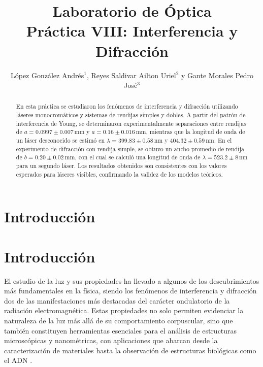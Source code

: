 \documentclass[article,12pt]{elsarticle}
\begin{document}

\begin{frontmatter}
    \title{Laboratorio de Óptica \\ Práctica VIII: Interferencia y Difracción}
    \author{López González Andrés$^1$, Reyes Saldivar Ailton Uriel$^2$ y Gante Morales Pedro José$^3$}
    \address{$^1$ Facultad de Ciencias, Universidad Nacional Autónoma de México, México CDMX.}

\begin{abstract}
En esta práctica se estudiaron los fenómenos de interferencia y difracción utilizando láseres monocromáticos y sistemas de rendijas simples y dobles. A partir del patrón de interferencia de Young, se determinaron experimentalmente separaciones entre rendijas de $a = 0.0997 \pm 0.007\, \text{mm}$ y $a = 0.16 \pm 0.016\, \text{mm}$, mientras que la longitud de onda de un láser desconocido se estimó en $ \lambda = 399.83 \pm 0.58\, \text{nm}$ y $404.32 \pm 0.59\, \text{nm}$. En el experimento de difracción con rendija simple, se obtuvo un ancho promedio de rendija de $b = 0.20 \pm 0.02\, \text{mm}$, con el cual se calculó una longitud de onda de $\lambda = 523.2 \pm 8\, \text{nm}$ para un segundo láser. Los resultados obtenidos son consistentes con los valores esperados para láseres visibles, confirmando la validez de los modelos teóricos.

\end{abstract}
    
\end{frontmatter}

\section{Introducción}

\section*{Introducción}

El estudio de la luz y sus propiedades ha llevado a algunos de los descubrimientos más fundamentales en la física, siendo los fenómenos de interferencia y difracción dos de las manifestaciones más destacadas del carácter ondulatorio de la radiación electromagnética. Estas propiedades no solo permiten evidenciar la naturaleza de la luz más allá de su comportamiento corpuscular, sino que también constituyen herramientas esenciales para el análisis de estructuras microscópicas y nanométricas, con aplicaciones que abarcan desde la caracterización de materiales hasta la observación de estructuras biológicas como el ADN \cite{hecht2000optica, pedrotti2018optics, barrios2025interferencia}.
\end{document}
